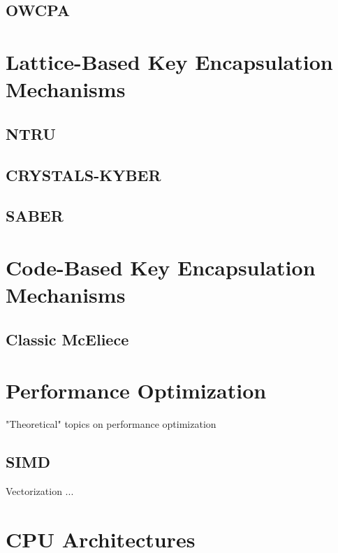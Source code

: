 \subsection{OWCPA}

\section{Lattice-Based Key Encapsulation Mechanisms}

\subsection{NTRU}


\subsection{CRYSTALS-KYBER}


\subsection{SABER}


\section{Code-Based Key Encapsulation Mechanisms}

\subsection{Classic McEliece}


\section{Performance Optimization}

"Theoretical" topics on performance optimization

\subsection{SIMD}

Vectorization ...

\section{CPU Architectures}


